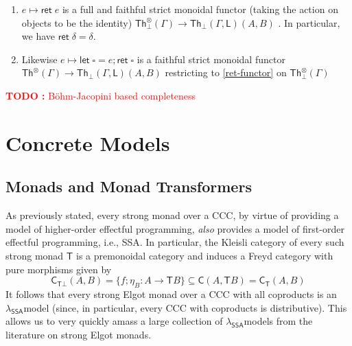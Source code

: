 \documentclass[acmsmall,screen,review]{acmart}
\newcounter{todos}
\newcommand{\TODO}[1]{{
  \stepcounter{todos}
  \begin{center}\large{\textcolor{red}{\textbf{TODO \arabic{todos}:} #1}}\end{center}
}}
\newcommand{\ms}[1]{\ensuremath{\mathsf{#1}}}
\newcommand{\letstmt}[3]{\ensuremath{\ms{let}\;#1 = #2; #3}}
\newcommand{\haslb}[3]{#1 \vdash #2 \rhd #3}
\newcommand{\teqv}{\approx}
\newcommand{\lbeq}[4]{#1 \vdash #2 \teqv #3 : {#4}}
\newcommand{\dnt}[1]{\llbracket{#1}\rrbracket}
\newcommand{\invar}{\square}
\newcommand{\isotopessa}{\(\lambda_{\ms{SSA}}\)}
\begin{document}
\begin{theorem}
  \begin{enumerate}[label=(\alph*)]
    \item $e \mapsto \ms{ret}\;e$ is a full and faithful strict monoidal functor
    (taking the action on objects to be the identity)
    $\ms{Th}^\otimes_\bot(\Gamma)  
      \to \ms{Th}_\bot(\Gamma, \ms{L})(A, B)$ \label{ret-functor}.
    In particular, we have $\ms{ret}\;\delta = \delta$.
    \item Likewise $e \mapsto \letstmt{\invar}{e}{\ms{ret}\;\invar}$ is a
      faithful strict monoidal functor $\ms{Th}^\otimes(\Gamma) \to
      \ms{Th}_\bot(\Gamma, \ms{L})(A, B)$ restricting to \ref{ret-functor} on
      $\ms{Th}^\otimes_\bot(\Gamma)$
  \end{enumerate}
\end{theorem}

\TODO{B\"ohm-Jacopini based completeness}

\section{Concrete Models}

\label{sec:concrete}

\subsection{Monads and Monad Transformers}

As previously stated, every strong monad over a CCC, by virtue of providing a
model of higher-order effectful programming, \emph{also} provides a model of
first-order effectful programming, i.e., SSA. In particular, the Kleisli
category of every such strong monad $\ms{T}$ is a premonoidal category and
induces a Freyd category with pure morphisms given by
\begin{equation}
  \ms{C}_{\ms{T}\bot}(A, B) = \{f;\eta_B : A \to \ms{T}B\} 
  \subseteq \ms{C}(A, \ms{T}B) = \ms{C}_{\ms{T}}(A, B)
\end{equation}
It follows that every strong Elgot monad over a CCC with all coproducts is an
\isotopessa model (since, in particular, every CCC with coproducts is
distributive). This allows us to very quickly amass a large collection of
\isotopessa models from the literature on strong Elgot monads.
\end{document}
